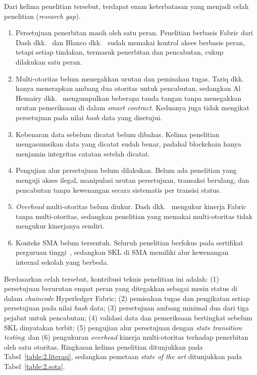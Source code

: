 Dari kelima penelitian tersebut, terdapat enam keterbatasan yang menjadi celah penelitian (\textit{research gap}).
\begin{enumerate}
    \item {Persetujuan penerbitan masih oleh satu peran.} Penelitian berbasis Fabric dari Dash dkk.~\cite{Dash2025Hyperledger} dan Blanco dkk.~\cite{Blanco2025Digital} sudah memakai kontrol akses berbasis peran, tetapi setiap tindakan, termasuk penerbitan dan pencabutan, cukup dilakukan satu peran.
    \item {Multi-otoritas belum menegakkan urutan dan pemisahan tugas.} Tariq dkk.~\cite{Tariq2023Cerberus} hanya menerapkan ambang dua otoritas untuk pencabutan, sedangkan Al Hemairy dkk.~\cite{AlHemairy2024UAE} mengumpulkan beberapa tanda tangan tanpa menegakkan urutan pemeriksaan di dalam \textit{smart contract}. Keduanya juga tidak mengikat persetujuan pada nilai \textit{hash} data yang disetujui.
    \item {Kebenaran data sebelum dicatat belum dibahas.} Kelima penelitian mengasumsikan data yang dicatat sudah benar, padahal blockchain hanya menjamin integritas catatan setelah dicatat.
    \item {Pengujian alur persetujuan belum dilakukan.} Belum ada penelitian yang menguji akses ilegal, manipulasi urutan persetujuan, transaksi berulang, dan pencabutan tanpa kewenangan secara sistematis per transisi status.
    \item {\textit{Overhead} multi-otoritas belum diukur.} Dash dkk.~\cite{Dash2025Hyperledger} mengukur kinerja Fabric tanpa multi-otoritas, sedangkan penelitian yang memakai multi-otoritas tidak mengukur kinerjanya sendiri.
    \item {Konteks SMA belum tersentuh.} Seluruh penelitian berfokus pada sertifikat perguruan tinggi~\cite{Pandari2026Blockchain}, sedangkan SKL di SMA memiliki alur kewenangan internal sekolah yang berbeda.
\end{enumerate}

Berdasarkan celah tersebut, kontribusi teknis penelitian ini adalah: (1) persetujuan berurutan empat peran yang ditegakkan sebagai mesin status di dalam \textit{chaincode} Hyperledger Fabric; (2) pemisahan tugas dan pengikatan setiap persetujuan pada nilai \textit{hash} data; (3) persetujuan ambang minimal dua dari tiga pejabat untuk pencabutan; (4) validasi data dan pemeriksaan bertingkat sebelum SKL dinyatakan terbit; (5) pengujian alur persetujuan dengan \textit{state transition testing}; dan (6) pengukuran \textit{overhead} kinerja multi-otoritas terhadap penerbitan oleh satu otoritas. Ringkasan kelima penelitian ditunjukkan pada Tabel~\ref{table:2.literasi}, sedangkan pemetaan \textit{state of the art} ditunjukkan pada Tabel~\ref{table:2.sota}.

